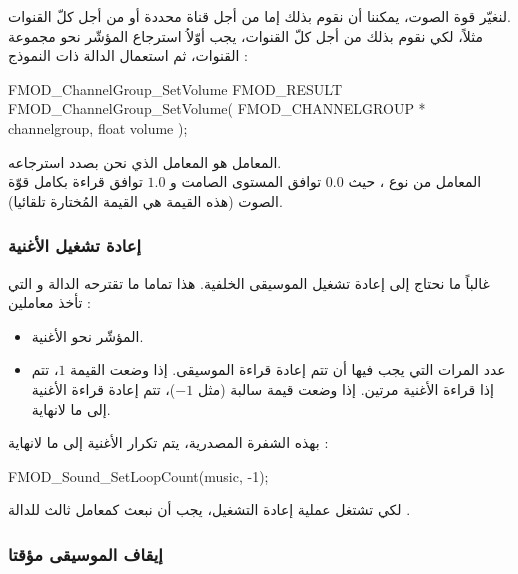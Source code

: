 لنغيّر قوة الصوت، يمكننا أن نقوم بذلك إما من أجل قناة محددة أو من أجل كلّ القنوات.\\
مثلاً، لكي نقوم بذلك من أجل كلّ القنوات، يجب أوّلاُ استرجاع المؤشّر نحو مجموعة القنوات، ثم استعمال الدالة
ذات النموذج :

\begin{Csource}
FMOD_ChannelGroup_SetVolume 
FMOD_RESULT FMOD_ChannelGroup_SetVolume(
	FMOD_CHANNELGROUP *  channelgroup,  float  volume
);
\end{Csource}

المعامل
هو المعامل الذي نحن بصدد استرجاعه.\\
المعامل
من نوع
،
حيث $ 0.0 $ توافق المستوى الصامت و $ 1.0  $ توافق قراءة بكامل قوّة الصوت (هذه القيمة هي القيمة المُختارة تلقائيا).

\subsubsection{إعادة تشغيل الأغنية}

غالباً ما نحتاج إلى إعادة تشغيل الموسيقى الخلفية. هذا تماما ما تقترحه الدالة
و التي تأخذ معاملين :

\begin{itemize}
	\item المؤشّر نحو الأغنية.
	\item عدد المرات التي يجب فيها أن تتم إعادة قراءة الموسيقى. إذا وضعت القيمة $ 1 $، تتم إذا قراءة الأغنية مرتين. إذا وضعت قيمة سالبة (مثل $ -1 $)، تتم إعادة قراءة الأغنية إلى ما لانهاية.
\end{itemize}

بهذه الشفرة المصدرية، يتم تكرار الأغنية إلى ما لانهاية : 

\begin{Csource}
FMOD_Sound_SetLoopCount(music, -1);
\end{Csource}

\begin{critical}
 لكي تشتغل عملية إعادة التشغيل، يجب أن نبعث 
 كمعامل ثالث للدالة
.
\end{critical}

\subsubsection{إيقاف الموسيقى مؤقتا}

